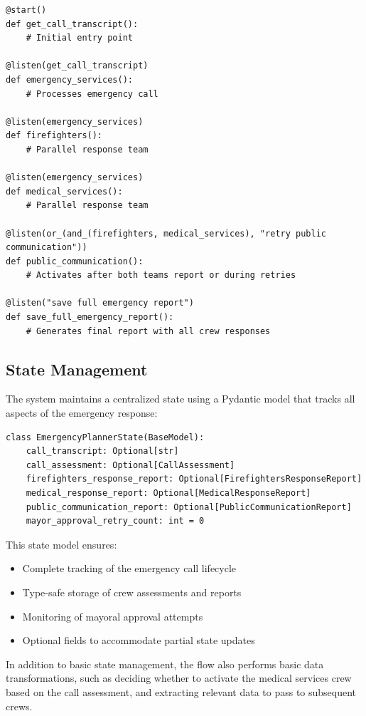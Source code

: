 \begin{lstlisting}[caption={Key Flow Control Points in Emergency Response}]
@start()
def get_call_transcript():
    # Initial entry point

@listen(get_call_transcript)
def emergency_services():
    # Processes emergency call

@listen(emergency_services)
def firefighters():
    # Parallel response team

@listen(emergency_services)
def medical_services():
    # Parallel response team

@listen(or_(and_(firefighters, medical_services), "retry public communication"))
def public_communication():
    # Activates after both teams report or during retries

@listen("save full emergency report")
def save_full_emergency_report():
    # Generates final report with all crew responses
\end{lstlisting}

\subsection{State Management}
The system maintains a centralized state using a Pydantic model that tracks all aspects of the emergency response:

\begin{lstlisting}[caption={Emergency Planner State Model}]
class EmergencyPlannerState(BaseModel):
    call_transcript: Optional[str]
    call_assessment: Optional[CallAssessment]
    firefighters_response_report: Optional[FirefightersResponseReport]
    medical_response_report: Optional[MedicalResponseReport]
    public_communication_report: Optional[PublicCommunicationReport]
    mayor_approval_retry_count: int = 0
\end{lstlisting}

This state model ensures:
\begin{itemize}
    \item Complete tracking of the emergency call lifecycle
    \item Type-safe storage of crew assessments and reports
    \item Monitoring of mayoral approval attempts
    \item Optional fields to accommodate partial state updates
\end{itemize}

In addition to basic state management, the flow also performs basic data transformations, such as deciding whether to activate the medical services crew based on the call assessment, and extracting relevant data to pass to subsequent crews.

